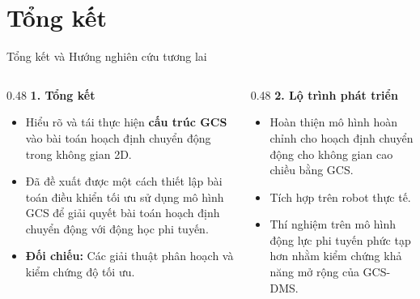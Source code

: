 \documentclass[aspectratio=169]{beamer}
\begin{document}


\section{Tổng kết}

\begin{frame}{Tổng kết và Hướng nghiên cứu tương lai}
    \begin{columns}[T, onlytextwidth]
        \begin{column}{0.48\textwidth}
            \textbf{1. Tổng kết}
            \vspace{0.2cm}
            \begin{itemize}
                \item Hiểu rõ và tái thực hiện \textbf{cấu trúc GCS} vào bài toán hoạch định chuyển
                      động trong không gian 2D.
                \item Đã đề xuất được một cách thiết lập bài toán điều khiển tối ưu sử dụng mô hình GCS
                      để giải quyết bài toán hoạch định chuyển động với động học phi tuyến.
                \item \textbf{Đối chiếu:} Các giải thuật phân hoạch và kiểm chứng độ tối ưu.
            \end{itemize}
        \end{column}

        \begin{column}{0.48\textwidth}
            \textbf{2. Lộ trình phát triển}
            \vspace{0.2cm}
            \begin{itemize}
                \item Hoàn thiện mô hình hoàn chỉnh cho hoạch định chuyển động cho không gian cao
                      chiều bằng GCS.
                \item Tích hợp trên robot thực tế. 
                \item Thí nghiệm trên mô hình động lực phi tuyến phức tạp hơn nhằm kiểm chứng khả năng mở rộng của GCS-DMS.
            \end{itemize}
        \end{column}
    \end{columns}

\end{frame}
\end{document}
